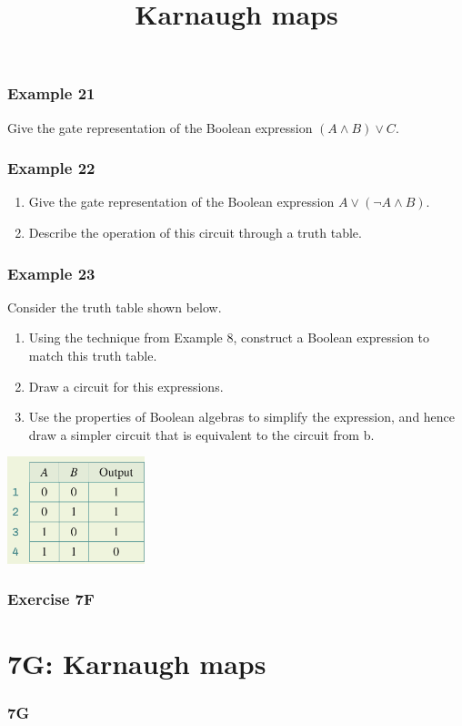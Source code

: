 \documentclass[
	11pt, %
]{beamer}
\begin{document}
\begin{frame}[t]
    \frametitle{Example 21}
    Give the gate representation of the Boolean expression $(A \land B) \lor C$.
\end{frame}

\begin{frame}[t]
    \frametitle{Example 22}
    \begin{enumerate}
        \item Give the gate representation of the Boolean expression $A \lor (\lnot A \land B)$.
        \item Describe the operation of this circuit through a truth table.
    \end{enumerate}
\end{frame}

\begin{frame}[t]
    \frametitle{Example 23}
    Consider the truth table shown below.\\
    \begin{enumerate}
        \item Using the technique from Example 8, construct a Boolean expression to match this truth table.
        \item Draw a circuit for this expressions.
        \item Use the properties of Boolean algebras to simplify the expression, and hence draw a simpler circuit that is equivalent to the circuit from b.
    \end{enumerate}
    \begin{center}
        \includegraphics[width = 4cm]{Ex23.png}
    \end{center}
\end{frame}
\begin{frame}
\end{frame}

\begin{frame}
    \frametitle{Exercise 7F}
\end{frame}

\section{7G: Karnaugh maps}
\begin{frame}
    \frametitle{7G}
    \begin{center}
        \title{Karnaugh maps}
        \maketitle
    \end{center}
\end{frame}
\end{document}
